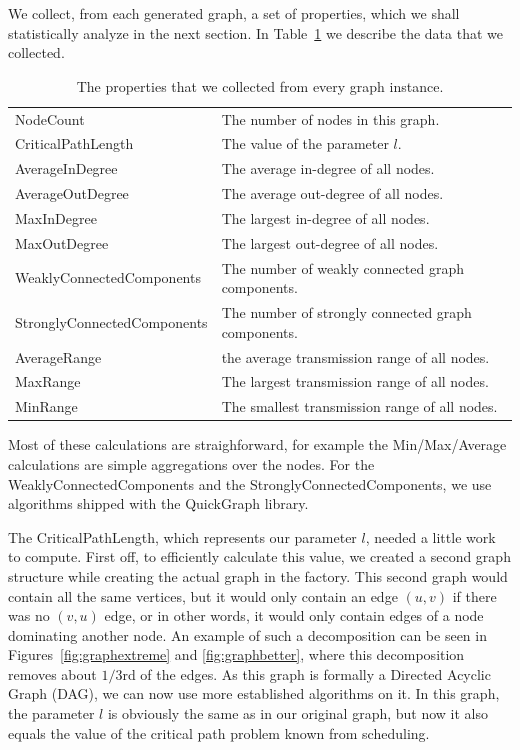We collect, from each generated graph, a set of properties, which we shall statistically analyze in the next section. In Table~\ref{table} we describe the data that we collected.
\begin{table}[th]
\begin{tabularx}{\textwidth}{l|X}
NodeCount	& The number of nodes in this graph.\\
CriticalPathLength & The value of the parameter $l$.\\
AverageInDegree	& The average in-degree of all nodes.\\
AverageOutDegree		& The average out-degree of all nodes.\\
MaxInDegree	& The largest in-degree of all nodes.\\
MaxOutDegree	& The largest out-degree of all nodes.\\
WeaklyConnectedComponents	& The number of weakly connected graph components.\\
StronglyConnectedComponents	& The number of strongly connected graph components.\\
AverageRange	& the average transmission range of all nodes.\\
MaxRange	& The largest transmission range of all nodes.\\
MinRange & The smallest transmission range of all nodes.\\

\end{tabularx}
\caption{The properties that we collected from every graph instance.\label{table}}
\end{table}

Most of these calculations are straighforward, for example the Min/Max/Average calculations are simple aggregations over the nodes. For the WeaklyConnectedComponents and the StronglyConnectedComponents, we use algorithms shipped with the QuickGraph library.

The CriticalPathLength, which represents our parameter $l$, needed a little work to compute. First off, to efficiently calculate this value, we created a second graph structure while creating the actual graph in the factory. This second graph would contain all the same vertices, but it would only contain an edge $(u,v)$ if there was no $(v, u)$ edge, or in other words, it would only contain edges of a node dominating another node. An example of such a decomposition can be seen in Figures~\ref{fig:graphextreme} and \ref{fig:graphbetter}, where this decomposition removes about $1/3$rd of the edges. As this graph is formally a Directed Acyclic Graph (DAG), we can now use more established algorithms on it. In this graph, the parameter $l$ is obviously the same as in our original graph, but now it also equals the value of the critical path problem known from scheduling.

